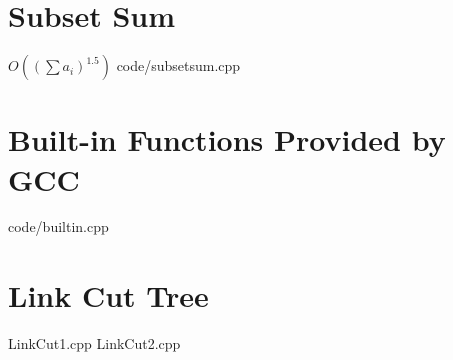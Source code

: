 \documentclass [landscape,8pt,a4paper,twocolumn]{article}
\begin{document}
\section{Subset Sum}
$ O((\sum a_i)^{1.5}) $
 {code/subsetsum.cpp}

\section{Built-in Functions Provided by GCC}
 {code/builtin.cpp}

\section{Link Cut Tree}
 {LinkCut1.cpp}
 {LinkCut2.cpp}
\end{document}
